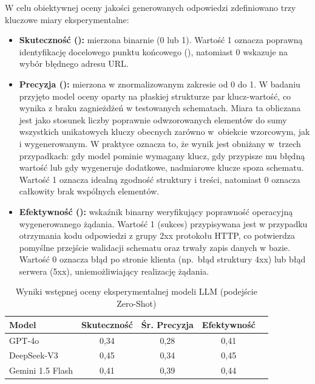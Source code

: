 W celu obiektywnej oceny jakości generowanych odpowiedzi zdefiniowano trzy kluczowe miary eksperymentalne:
\begin{itemize}
    \item \textbf{Skuteczność ():} mierzona binarnie (0 lub 1). Wartość 1 oznacza poprawną identyfikację docelowego punktu końcowego (), natomiast 0 wskazuje na wybór błędnego adresu URL.
    \item \textbf{Precyzja ():} mierzona w znormalizowanym zakresie od 0 do 1. W badaniu przyjęto model oceny oparty na płaskiej strukturze par klucz-wartość, co wynika z braku zagnieżdżeń w testowanych schematach. Miara ta obliczana jest jako stosunek liczby poprawnie odwzorowanych elementów do sumy wszystkich unikatowych kluczy obecnych zarówno w~obiekcie wzorcowym, jak i wygenerowanym. W praktyce oznacza to, że wynik jest obniżany w~trzech przypadkach: gdy model pominie wymagany klucz, gdy przypisze mu błędną wartość lub gdy wygeneruje dodatkowe, nadmiarowe klucze spoza schematu. Wartość 1 oznacza idealną zgodność struktury i treści, natomiast 0 oznacza całkowity brak wspólnych elementów.
    \item \textbf{Efektywność ():} wskaźnik binarny weryfikujący poprawność operacyjną wygenerowanego żądania. Wartość 1 (sukces) przypisywana jest w przypadku otrzymania kodu odpowiedzi z grupy 2xx protokołu HTTP, co potwierdza pomyślne przejście walidacji schematu oraz trwały zapis danych w bazie. Wartość 0 oznacza błąd po stronie klienta (np.~błąd struktury 4xx) lub błąd serwera (5xx), uniemożliwiający realizację żądania.
\end{itemize}

\begin{table}[h!]
\centering
\caption{Wyniki wstępnej oceny eksperymentalnej modeli LLM (podejście Zero-Shot)}
\label{tab:llm_comparison1}
\begin{tabular}{|l|c|c|c|c|}
\hline
\textbf{Model} & \textbf{Skuteczność} & \textbf{Śr. Precyzja} & \textbf{Efektywność} \\ \hline
GPT-4o         & 0,34                 & 0,28                  & 0,41                 \\ \hline
DeepSeek-V3    & 0,45                 & 0,34                  & 0,45                 \\ \hline
Gemini 1.5 Flash & 0,41               & 0,39                  & 0,44                 \\ \hline
\end{tabular}
\end{table}

